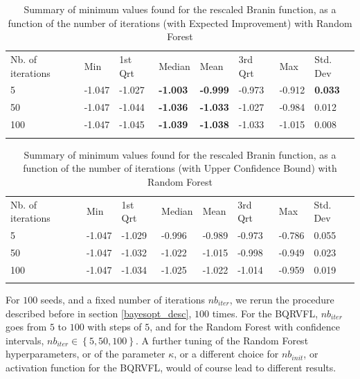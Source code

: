 \begin{table}[!htb]
\begin{center}
\caption{Summary of minimum values found for the rescaled Branin function, as a function of the number of iterations (with Expected Improvement) with Random Forest}
\label{tab:min_values_rf_ei}       %
\begin{tabular}{llllllll}
\hline\noalign{\smallskip}
Nb. of iterations & Min & 1st Qrt  & Median & Mean  & 3rd Qrt  & Max & Std. Dev \\
\noalign{\smallskip}\hline\noalign{\smallskip}
  5   & -1.047 & -1.027 & \textbf{-1.003} & \textbf{-0.999} & -0.973 & -0.912 & \textbf{0.033} \\
  50  & -1.047 & -1.044 & \textbf{-1.036} & \textbf{-1.033} & -1.027 & -0.984 & 0.012 \\
  100 & -1.047 & -1.045 & \textbf{-1.039} & \textbf{-1.038} & -1.033 & -1.015 & 0.008 \\
\noalign{\smallskip}\hline
\end{tabular}
\end{center}
\end{table}

\begin{table}[!htb]
\begin{center}
\caption{Summary of minimum values found for the rescaled Branin function, as a function of the number of iterations (with Upper Confidence Bound) with Random Forest}
\label{tab:min_values_rf_ucb}       %
\begin{tabular}{llllllll}
\hline\noalign{\smallskip}
Nb. of iterations & Min & 1st Qrt  & Median & Mean  & 3rd Qrt  & Max & Std. Dev \\
\noalign{\smallskip}\hline\noalign{\smallskip}
  5   & -1.047 & -1.029 & -0.996 & -0.989 & -0.973 & -0.786 & 0.055 \\
  50  & -1.047 & -1.032 & -1.022 & -1.015 & -0.998 & -0.949 & 0.023 \\
  100 & -1.047 & -1.034 & -1.025 & -1.022 & -1.014 & -0.959 & 0.019 \\
\noalign{\smallskip}\hline
\end{tabular}
\end{center}
\end{table}

\newpage

For $100$ seeds, and a fixed number of iterations $nb_{iter}$, we rerun the procedure described before in section \ref{bayesopt_desc}, $100$ times. For the BQRVFL, $nb_{iter}$ goes from $5$ to $100$ with steps of $5$, and for the Random Forest with confidence intervals, $nb_{iter} \in \left \lbrace 5, 50, 100 \right \rbrace$. A further tuning of the Random Forest hyperparameters, or of the parameter $\kappa$, or a different choice for $nb_{init}$, or activation function for the BQRVFL, would of course lead to different results. 

